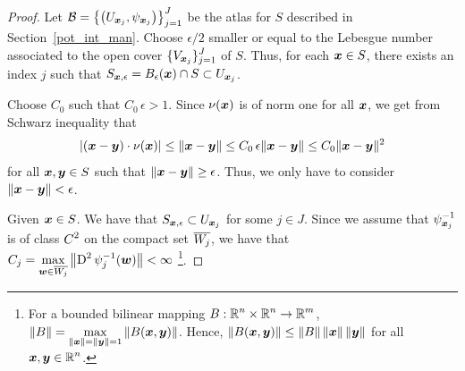 \begin{proof}
Let $\displaystyle \mathcal{B} = \left\{ \left(U_{{\bm{x}}_j},
\psi_{{\bm{x}}_j}\right) \right \}_{j=1}^J$ be the atlas for
$S$ described in Section~\ref{pot_int_man}.
Choose $\epsilon/2$ smaller or equal to the Lebesgue number associated
to the open cover $\displaystyle \{ V_{{\bm{x}}_j}\}_{j=1}^J$ of $S$.  Thus,
for each ${\bm{x}} \in S$, there exists an index $j$ such that
$\displaystyle
S_{{\bm{x}},\epsilon} = B_{\epsilon}({\bm{x}}) \cap S \subset U_{{\bm{x}}_j}$.

Choose $C_0$ such that $C_0\,\epsilon > 1$.  Since
$\nu({\bm{x}})$ is of norm one for all ${\bm{x}}$, we get from
Schwarz inequality that
\[
\left| ({\bm{x}}-{\bm{y}}) \cdot \nu({\bm{x}}) \right|
\leq \|{\bm{x}}-{\bm{y}}\|
\leq C_0\,\epsilon \|{\bm{x}}-{\bm{y}}\|
\leq C_0 \|{\bm{x}}-{\bm{y}}\|^2
\]
for all ${\bm{x}}, {\bm{y}} \in S$ such that
$\|{\bm{x}}-{\bm{y}}\| \geq \epsilon$.
Thus, we only have to consider $\|{\bm{x}}-{\bm{y}}\| < \epsilon$.

Given ${\bm{x}} \in S$.  We have that
$\displaystyle S_{{\bm{x}},\epsilon} \subset U_{{\bm{x}}_j}$ for some $j \in J$.
Since we assume that
$\displaystyle \psi_{{\bm{x}}_j}^{-1}$ is of class $\displaystyle C^2$
on the compact set $\displaystyle \overline{W_j}$, we
have that $\displaystyle C_j = \max_{{\bm{w}} \in \overline{W_j}}
\left\| \operatorname{D}^2 \psi_j^{-1}({\bm{w}}) \right\| < \infty$
\footnote{For a bounded bilinear mapping
$\displaystyle B:\mathbb{R}^n \times \mathbb{R}^n \to \mathbb{R}^m$,
$\displaystyle \|B\| = \max_{\|{\bm{x}}\|= \|{\bm{y}}\|=1}
\|B({\bm{x}},{\bm{y}})\|$.
Hence, $\|B({\bm{x}},{\bm{y}})\| \leq \|B\| \, \|{\bm{x}}\|\, \|{\bm{y}}\|$
for all $\displaystyle {\bm{x}}, {\bm{y}} \in \mathbb{R}^n$.}.


\end{proof}
